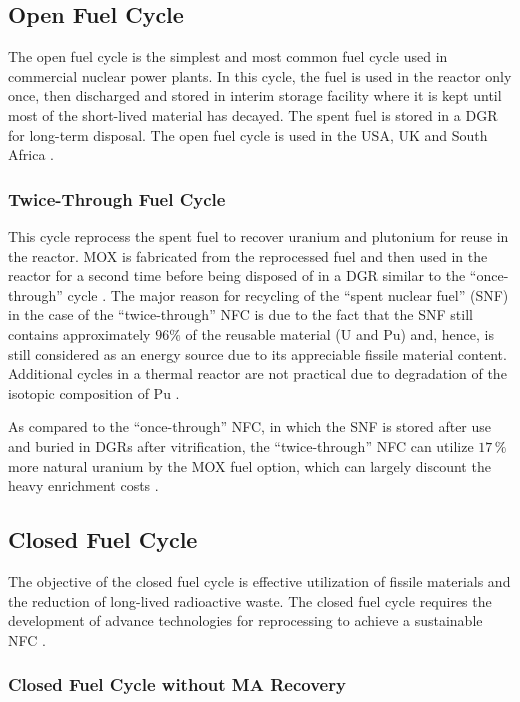 \subsection{Open Fuel Cycle}

The open fuel cycle is the simplest and most common fuel cycle used in commercial nuclear power plants. In this cycle, the fuel is used in the reactor only once, then discharged and stored in interim storage facility where it is kept until most of the short-lived material has decayed. The spent fuel is stored in a DGR for long-term disposal. The open fuel cycle is used in the USA, UK and South Africa \cite{fuel_cycle_book}.

\subsubsection{Twice-Through Fuel Cycle}

This cycle reprocess the spent fuel to recover uranium and plutonium for reuse in the reactor. MOX is fabricated from the reprocessed fuel and then used in the reactor for a second time before being disposed of in a DGR similar to the ``once-through'' cycle \cite{fuel_cycle_book}. The major reason for recycling of the “spent nuclear fuel” (SNF) in the case of the “twice-through” NFC is due to the fact that the SNF still contains approximately \(96\%\) of the reusable material (U and Pu) and, hence, is still considered as an energy source due to its appreciable fissile material content. Additional cycles in a thermal reactor are not practical due to degradation of the isotopic composition of Pu \cite{fuel_cycle_book}.

As compared to the “once-through” NFC, in which the SNF is stored after use and buried in DGRs after vitrification, the “twice-through” NFC can utilize \(17 \, \%\) more natural uranium by the MOX fuel option, which can largely discount the heavy enrichment costs \cite{fuel_cycle_book}. 

\subsection{Closed Fuel Cycle}

The objective of the closed fuel cycle is effective utilization of fissile materials and the reduction of long-lived radioactive waste. The closed fuel cycle requires the development of advance technologies for reprocessing to achieve a sustainable NFC \cite{fuel_cycle_book}. 

\subsubsection{Closed Fuel Cycle without MA Recovery}

